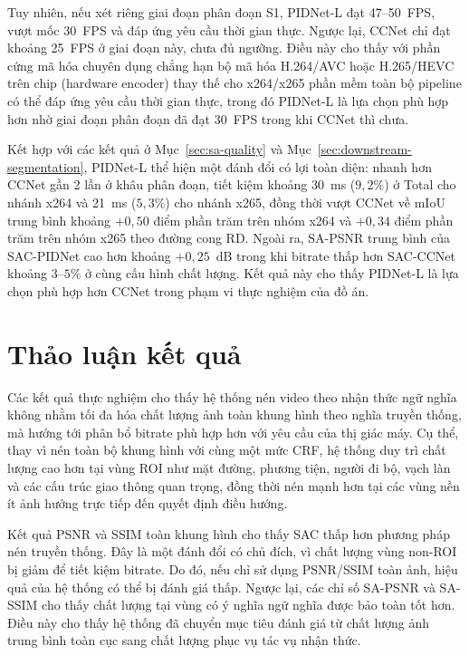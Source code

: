 Tuy nhiên, nếu xét riêng giai đoạn phân đoạn S1, PIDNet-L đạt 47--50~FPS, vượt mốc 30~FPS và đáp ứng yêu cầu thời gian thực. Ngược lại, CCNet chỉ đạt khoảng 25~FPS ở giai đoạn này, chưa đủ ngưỡng. Điều này cho thấy với phần cứng mã hóa chuyên dụng chẳng hạn bộ mã hóa H.264/AVC hoặc H.265/HEVC trên chip (hardware encoder) thay thế cho x264/x265 phần mềm toàn bộ pipeline có thể đáp ứng yêu cầu thời gian thực, trong đó PIDNet-L là lựa chọn phù hợp hơn nhờ giai đoạn phân đoạn đã đạt 30~FPS trong khi CCNet thì chưa.

Kết hợp với các kết quả ở Mục~\ref{sec:sa-quality} và Mục~\ref{sec:downstream-segmentation}, PIDNet-L thể hiện một đánh đổi có lợi toàn diện: nhanh hơn CCNet gần 2 lần ở khâu phân đoạn, tiết kiệm khoảng 30~ms ($9{,}2\%$) ở Total cho nhánh x264 và 21~ms ($5{,}3\%$) cho nhánh x265, đồng thời vượt CCNet về mIoU trung bình khoảng $+0{,}50$ điểm phần trăm trên nhóm x264 và $+0{,}34$ điểm phần trăm trên nhóm x265 theo đường cong RD. Ngoài ra, SA-PSNR trung bình của SAC-PIDNet cao hơn khoảng $+0{,}25$~dB trong khi bitrate thấp hơn SAC-CCNet khoảng $3$--$5\%$ ở cùng cấu hình chất lượng. Kết quả này cho thấy PIDNet-L là lựa chọn phù hợp hơn CCNet trong phạm vi thực nghiệm của đồ án.

\section{Thảo luận kết quả}
\label{sec:thao-luan}

Các kết quả thực nghiệm cho thấy hệ thống nén video theo nhận thức ngữ nghĩa không nhằm tối đa hóa chất lượng ảnh toàn khung hình theo nghĩa truyền thống, mà hướng tới phân bổ bitrate phù hợp hơn với yêu cầu của thị giác máy. Cụ thể, thay vì nén toàn bộ khung hình với cùng một mức CRF, hệ thống duy trì chất lượng cao hơn tại vùng ROI như mặt đường, phương tiện, người đi bộ, vạch làn và các cấu trúc giao thông quan trọng, đồng thời nén mạnh hơn tại các vùng nền ít ảnh hưởng trực tiếp đến quyết định điều hướng.

Kết quả PSNR và SSIM toàn khung hình cho thấy SAC thấp hơn phương pháp nén truyền thống. Đây là một đánh đổi có chủ đích, vì chất lượng vùng non-ROI bị giảm để tiết kiệm bitrate. Do đó, nếu chỉ sử dụng PSNR/SSIM toàn ảnh, hiệu quả của hệ thống có thể bị đánh giá thấp. Ngược lại, các chỉ số SA-PSNR và SA-SSIM cho thấy chất lượng tại vùng có ý nghĩa ngữ nghĩa được bảo toàn tốt hơn. Điều này cho thấy hệ thống đã chuyển mục tiêu đánh giá từ chất lượng ảnh trung bình toàn cục sang chất lượng phục vụ tác vụ nhận thức.

